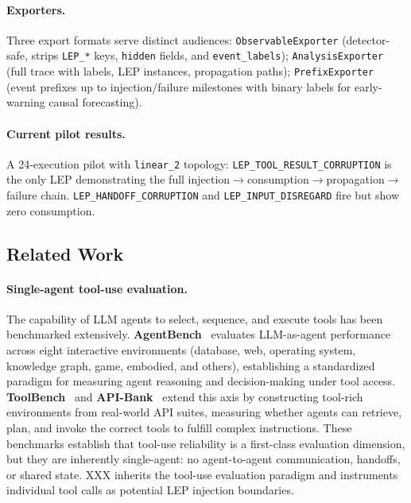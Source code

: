 \paragraph{Exporters.}
Three export formats serve distinct audiences: \texttt{ObservableExporter} (detector-safe, strips \texttt{LEP\_*} keys, \texttt{hidden} fields, and \texttt{event\_labels}); \texttt{AnalysisExporter} (full trace with labels, LEP instances, propagation paths); \texttt{PrefixExporter} (event prefixes up to injection/failure milestones with binary labels for early-warning causal forecasting).

\paragraph{Current pilot results.}
A 24-execution pilot with \texttt{linear\_2} topology: \texttt{LEP\_TOOL\_RESULT\_CORRUPTION} is the only LEP demonstrating the full injection$\to$consumption$\to$propagation$\to$failure chain. \texttt{LEP\_HANDOFF\_CORRUPTION} and \texttt{LEP\_INPUT\_DISREGARD} fire but show zero consumption.

\subsection{Related Work}

\paragraph{Single-agent tool-use evaluation.}
The capability of LLM agents to select, sequence, and execute tools has been
benchmarked extensively. \textbf{AgentBench}~\citep{liu2023agentbench}
evaluates LLM-as-agent performance across eight interactive environments
(database, web, operating system, knowledge graph, game, embodied, and
others), establishing a standardized paradigm for measuring agent reasoning
and decision-making under tool access. \textbf{ToolBench}~\citep{qin2023toolbench}
and \textbf{API-Bank}~\citep{li2023apibank} extend this axis by constructing
tool-rich environments from real-world API suites, measuring whether agents
can retrieve, plan, and invoke the correct tools to fulfill complex
instructions. These benchmarks establish that tool-use reliability is a
first-class evaluation dimension, but they are inherently single-agent:
no agent-to-agent communication, handoffs, or shared state. XXX
inherits the tool-use evaluation paradigm and instruments individual tool
calls as potential LEP injection boundaries.

